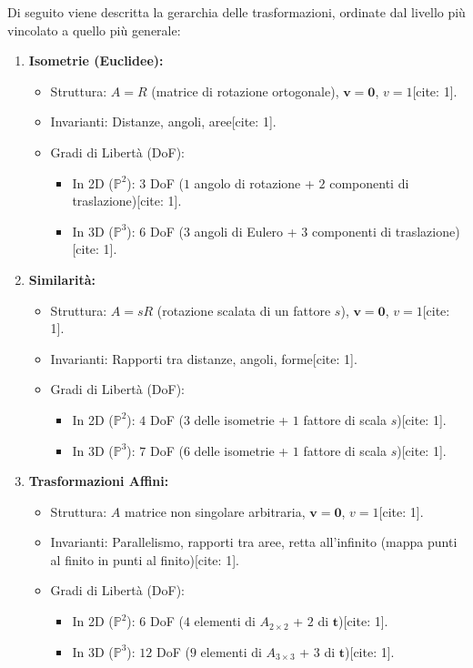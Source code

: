 Di seguito viene descritta la gerarchia delle trasformazioni, ordinate dal livello più vincolato a quello più generale:

\begin{enumerate}
    \item \textbf{Isometrie (Euclidee):}
    \begin{itemize}
        \item Struttura: $A = R$ (matrice di rotazione ortogonale), $\mathbf{v} = \mathbf{0}$, $v = 1$[cite: 1].
        \item Invarianti: Distanze, angoli, aree[cite: 1].
        \item Gradi di Libertà (DoF):
        \begin{itemize}
            \item In 2D ($\mathbb{P}^2$): $3$ DoF ($1$ angolo di rotazione + $2$ componenti di traslazione)[cite: 1].
            \item In 3D ($\mathbb{P}^3$): $6$ DoF ($3$ angoli di Eulero + $3$ componenti di traslazione)[cite: 1].
        \end{itemize}
    \end{itemize}

    \item \textbf{Similarità:}
    \begin{itemize}
        \item Struttura: $A = sR$ (rotazione scalata di un fattore $s$), $\mathbf{v} = \mathbf{0}$, $v = 1$[cite: 1].
        \item Invarianti: Rapporti tra distanze, angoli, forme[cite: 1].
        \item Gradi di Libertà (DoF):
        \begin{itemize}
            \item In 2D ($\mathbb{P}^2$): $4$ DoF ($3$ delle isometrie + $1$ fattore di scala $s$)[cite: 1].
            \item In 3D ($\mathbb{P}^3$): $7$ DoF ($6$ delle isometrie + $1$ fattore di scala $s$)[cite: 1].
        \end{itemize}
    \end{itemize}

    \item \textbf{Trasformazioni Affini:}
    \begin{itemize}
        \item Struttura: $A$ matrice non singolare arbitraria, $\mathbf{v} = \mathbf{0}$, $v = 1$[cite: 1].
        \item Invarianti: Parallelismo, rapporti tra aree, retta all'infinito (mappa punti al finito in punti al finito)[cite: 1].
        \item Gradi di Libertà (DoF):
        \begin{itemize}
            \item In 2D ($\mathbb{P}^2$): $6$ DoF ($4$ elementi di $A_{2 \times 2}$ + $2$ di $\mathbf{t}$)[cite: 1].
            \item In 3D ($\mathbb{P}^3$): $12$ DoF ($9$ elementi di $A_{3 \times 3}$ + $3$ di $\mathbf{t}$)[cite: 1].
        \end{itemize}
    \end{itemize}


\end{enumerate}
